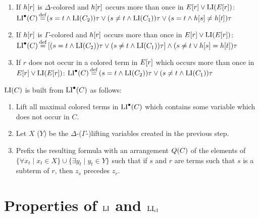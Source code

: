 \documentclass[,%
	draft=false,%
	numbers=noendperiod
	11pt,
	a4paper,
	oneside,%
	openany,
]{memoir}
\begin{document}
\begin{defi}
\begin{description}
			\begin{enumerate}

				\item If $h[r]$ is $\Delta$-colored and $h[r]$ occurs more than once in $E[r] \lor \operatorname{LI}(E[r])$:
					\newline
					$\operatorname{LI}^\bullet(C) \operatorname{\stackrel{\mathrm{def}}{=}}  ( s=t \land \operatorname{LI}(C_2) )\tau \lor (s\neq t \land \operatorname{LI}(C_1))\tau \lor (s=t \land h[s] \neq      h[t])\tau$

				\item If $h[r]$ is $\Gamma$-colored and $h[r]$ occurs more than once in $E[r] \lor \operatorname{LI}(E[r])$:
					\newline
					$\operatorname{LI}^\bullet(C)\operatorname{\stackrel{\mathrm{def}}{=}}{} [ ( s=t \land \operatorname{LI}(C_2) )\tau \lor (s\neq t \land \operatorname{LI}(C_1))\tau ] \land\allowbreak (s\neq t \lor h[s] = h[t])\tau$

				\item If $r$ does not occur in a colored term in $E[r]$ which occurs more than once in $E[r] \lor \operatorname{LI}(E[r])$:
					\newline
					$\operatorname{LI}^\bullet(C) \operatorname{\stackrel{\mathrm{def}}{=}}{} ( s=t \land \operatorname{LI}(C_2) )\tau \lor (s\neq t \land \operatorname{LI}(C_1))\tau $ 

			\end{enumerate}

	\end{description}

	\noindent
	$\operatorname{LI}(C)$ is built from $\operatorname{LI}^\bullet(C)$ as follows:

	\begin{enumerate}
		\item Lift all maximal colored terms in $\operatorname{LI}^\bullet(C)$ which contains some variable which does not occur in $C$.
		\item Let $X$ ($Y$) be the $\Delta$-($\Gamma$-)lifting variables created in the previous step.
		\item Prefix the resulting formula with an arrangement $Q(C)$ of the elements of $\{\forall x_t \mid x_t \in X\}\cup\allowbreak\{\exists y_t \mid y_t \in Y\}$ such that if $s$ and $r$ are terms such that $s$ is a subterm of $r$, then $z_s$ precedes $z_r$.
			\qedhere
	\end{enumerate}
\end{defi}

\section{Properties of $\operatorname{LI}$ and $\operatorname{LI}_{\operatorname{cl}}$}
\end{document}
